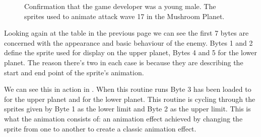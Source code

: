 \begin{figure}[H]
  {
    \setlength{\tabcolsep}{3.0pt}
    \setlength\cmidrulewidth{\heavyrulewidth} %
	\centering
	\def\MULTICOLORONE{red}
	\def\MULTICOLORTWO{white}
	\def\SPRITECOLOR{orange}
	\begin{subfigure}{0.3\textwidth}
		
	\end{subfigure}
	\begin{subfigure}{0.3\textwidth}
		
	\end{subfigure}
	\begin{subfigure}{0.3\textwidth}
		
	\end{subfigure}
  }\caption[position=top]{Confirmation that the game developer was a young male. The sprites used to animate attack wave 17 in the Mushroom Planet.}
\end{figure}

Looking again at the table in the previous page we can see the first 7 bytes are concerned with the appearance and basic behaviour of the
enemy. Bytes 1 and 2 define the sprite used for display on the upper planet, Bytes 4 and 5
for the lower planet. The reason there's two in each case is because they are describing the
start and end point of the sprite's animation. 

We can see this in action in . When this routine runs Byte 3 has been loaded
to  for the upper planet and 
for the lower planet. This routine is cycling through the sprites given by Byte 1 as the lower limit and Byte 2 as 
the upper limit. This is what the animation consists of: an animation effect achieved by changing the sprite from
one to another to create a classic animation effect.

